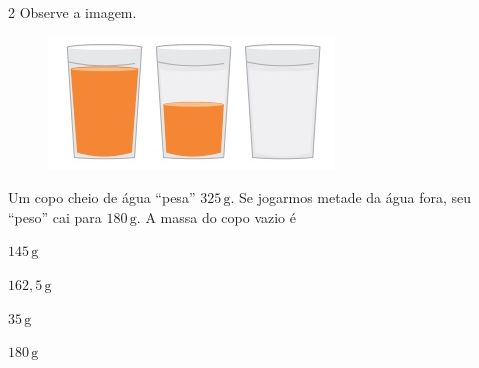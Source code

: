 {{{{\begin{escolha}
{%

\num{2}  Observe a imagem.

\begin{figure}[H]
\centering\includegraphics[width=2.98958in,height=1.38542in]{./imgSAEB_6_MAT/media/image100.png}
\end{figure}

Um copo cheio de água ``pesa'' $325\,\text{g}$. Se jogarmos metade da água fora, seu
``peso'' cai para $180\,\text{g}$. A massa do copo vazio é

\begin{escolha}
\item $145\,\text{g}$
\item $162,5\,\text{g}$
\item $35\,\text{g}$
\item $180\,\text{g}$
\end{escolha}



}
\end{escolha}}}}}
